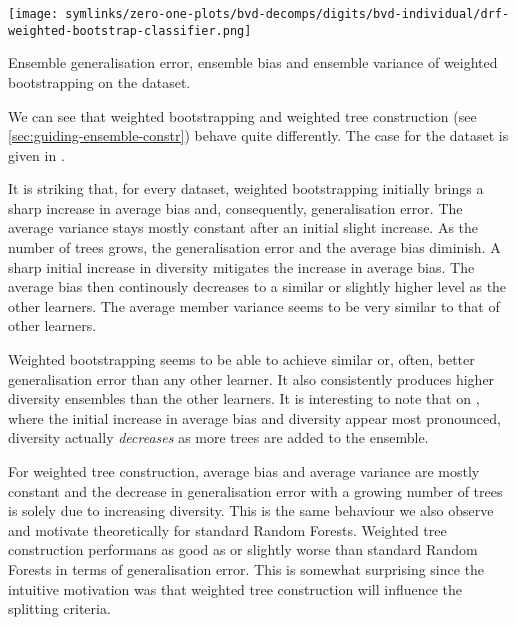 \documentclass[../main.tex]{subfiles}
\begin{document}
\begin{marginfigure}
    \texttt{[image: symlinks/zero-one-plots/bvd-decomps/digits/bvd-individual/drf-weighted-bootstrap-classifier.png]}
    \caption{
        Ensemble generalisation error, ensemble bias and ensemble variance of weighted bootstrapping on the \digits dataset. 
    }
    \label{fig:digits-bvd}
\end{marginfigure}



%
We can see that weighted bootstrapping and weighted tree construction (see \ref{sec:guiding-ensemble-constr}) behave quite differently. The case for the \spambase dataset is given in . 

It is striking that, for every dataset, weighted bootstrapping initially brings a sharp increase in average bias and, consequently, generalisation error. The average variance stays mostly constant after an initial slight increase. As the number of trees grows, the generalisation error and the average bias diminish. A sharp initial increase in diversity mitigates the increase in average bias. The average bias then continously decreases to a similar or slightly higher level as the other learners. The average member variance seems to be very similar to that of other learners.

Weighted bootstrapping seems to be able to achieve similar or, often, better generalisation error than any other learner.  It also consistently produces higher diversity ensembles than the other learners.
It is interesting to note that on \spambase, where the initial increase in average bias and diversity appear most pronounced, diversity actually \textit{decreases} as more trees are added to the ensemble. 

For weighted tree construction, average bias and average variance are mostly constant and the decrease in generalisation error with a growing number of trees is solely due to increasing diversity. This is the same behaviour we also observe and motivate theoretically for standard Random Forests. Weighted tree construction performans as good as or slightly worse than standard Random Forests in terms of generalisation error. This is somewhat surprising since the intuitive motivation was that weighted tree construction will influence the splitting criteria. 
\end{document}
